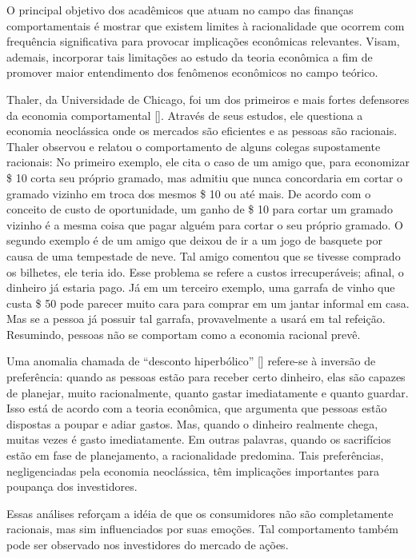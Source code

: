 \documentclass[brazil,ruledheader]{abnt}
\renewcommand{\cite}[1]{[\citeonline{#1}]}
\begin{document}
O principal objetivo dos acadêmicos que atuam no campo  das
finanças comportamentais é mostrar que existem limites à racionalidade
que ocorrem com frequência signi\-ficativa para provocar implicações
econômicas relevantes. Visam, ademais,  incorporar tais limitações ao estudo
da teoria econômica a fim de promover maior entendimento dos fenômenos
econômicos no campo teórico.

Thaler, da Universidade de Chicago, foi um dos primeiros e mais fortes
defensores da economia comportamental \cite{So02}. Através de seus estudos,
ele questiona a economia neoclássica onde os mercados são eficientes e as
pessoas são racionais. Thaler observou e relatou o comportamento de alguns
colegas supostamente racionais: No primeiro exemplo, ele cita o caso de um
amigo que, para economizar \$ 10 corta seu próprio gramado, mas admitiu que
nunca concordaria em cortar o gramado vizinho em troca dos mesmos \$ 10 ou
até mais. De acordo com o conceito de custo de oportunidade, um ganho de \$
10 para cortar um gramado vizinho é a mesma coisa que pagar alguém para cortar
o seu próprio gramado. O segundo exemplo é de um amigo que deixou de ir a um
jogo de basquete por causa de uma tempestade de neve. Tal amigo comentou que
se tivesse comprado os bilhetes, ele teria ido. Esse problema se refere a
custos irrecuperáveis; afinal, o dinheiro já estaria pago. Já em um
terceiro exemplo, uma garrafa de vinho que custa \$ 50 pode parecer muito cara
para  comprar em um jantar informal em casa. Mas se a pessoa já possuir
tal garrafa, provavelmente a usará em tal refeição. Resumindo, pessoas não
se comportam como a economia racional prevê.

Uma anomalia chamada de ``desconto hiperbólico'' \cite{So02} refere-se à
inversão
de preferência: quando as pessoas estão para receber certo dinheiro, elas são
capazes de planejar, muito racio\-nalmente, quanto gastar imediatamente e
quanto guardar. Isso está de acordo com a teoria econômica, que argumenta
que pessoas estão dispostas a poupar e adiar gastos. Mas, quando o
dinheiro realmente chega, muitas vezes é gasto imediatamente. Em outras
palavras, quando os sacrifícios estão em fase de planejamento, a
racionalidade predomina. Tais preferências, negligenciadas pela
economia neoclássica, têm implicações importantes para poupança dos
investidores.

Essas análises reforçam a idéia de que os consumidores não são
completamente racionais, mas sim influenciados por suas emoções.
Tal comportamento também pode ser observado nos investidores do mercado de
ações.
\end{document}
